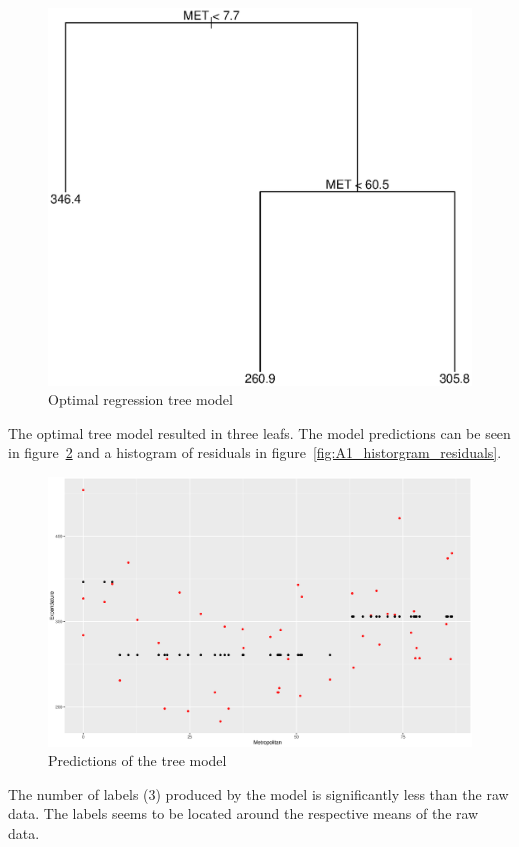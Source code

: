 \documentclass[a4paper,12pt]{article}
\begin{document}
    \begin{figure}[H]
    \centering
    \includegraphics[width=\textwidth]{figures/A1_tree}  
    \caption{Optimal regression tree model \label{fig:A1_tree}}
    \end{figure}
    The optimal tree model resulted in three leafs. The model predictions can be seen in figure~\ref{fig:A1_fit} and a histogram of residuals in figure~\ref{fig:A1_historgram_residuals}.

    \begin{figure}[H]
    \centering
    \includegraphics[width=\textwidth]{figures/A1_fit}  
    \caption{Predictions of the tree model \label{fig:A1_fit}}
    \end{figure}
    The number of labels (3) produced by the model is significantly less than the raw data. The labels seems to be located around the respective means of the raw data. 
\end{document}
